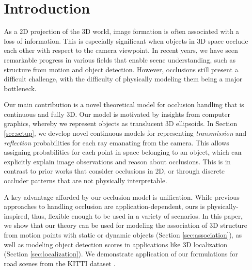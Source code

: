 \section{Introduction}


As a 2D projection of the 3D world, image formation is often associated with a loss of information. This is especially significant when objects in 3D space occlude each other with respect to the camera viewpoint. In recent years, we have seen remarkable progress in various fields that enable scene understanding, such as structure from motion and object detection. However, occlusions still present a difficult challenge, with the difficulty of physically modeling them being a major bottleneck. 


Our main contribution is a novel theoretical model for occlusion handling that is continuous and fully 3D. Our model is motivated by insights from computer graphics, whereby we represent objects as translucent 3D ellipsoids. In Section \ref{sec:setup}, we develop novel continuous models for representing \emph{transmission} and \emph{reflection} probabilities for each ray emanating from the camera. This allows assigning probabilities for each point in space belonging to an object, which can explicitly explain image observations and reason about occlusions. This is in contrast to prior works that consider occlusions in 2D, or through discrete occluder patterns that are not physically interpretable.


A key advantage afforded by our occlusion model is unification. While previous approaches to handling occlusion are application-dependent, ours is physically-inspired, thus, flexible enough to be used in a variety of scenarios. In this paper, we show that our theory can be used for modeling the association of 3D structure from motion points with static or dynamic objects (Section \ref{sec:association}), as well as modeling object detection scores in applications like 3D localization (Section \ref{sec:localization}). We demonstrate application of our formulations for road scenes from the KITTI dataset \cite{Geiger_etal_2012}.


